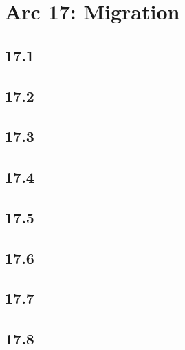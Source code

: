 \part*{Arc 17: Migration}
 \chapter*{17.1}
 \chapter*{17.2}
 \chapter*{17.3}
 \chapter*{17.4}
 \chapter*{17.5}
 \chapter*{17.6}
 \chapter*{17.7}
 \chapter*{17.8}









